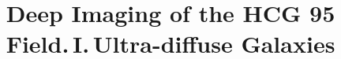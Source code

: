 \documentclass[twocolumn,trackchanges]{aastex61}
\begin{document}
\title{Deep Imaging of the HCG 95 Field.\,I.\,Ultra-diffuse Galaxies}


\end{document}

